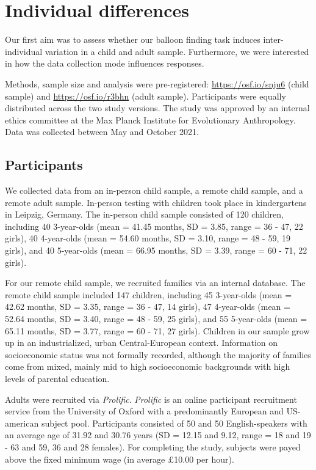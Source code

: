 \documentclass[
  man,floatsintext]{apa6}
\begin{document}
\hypertarget{individual-differences}{%
\section{Individual differences}\label{individual-differences}}

Our first aim was to assess whether our balloon finding task induces inter-individual variation in a child and adult sample. Furthermore, we were interested in how the data collection mode influences responses.

Methods, sample size and analysis were pre-registered: \url{https://osf.io/snju6} (child sample) and \url{https://osf.io/r3bhn} (adult sample). Participants were equally distributed across the two study versions. The study was approved by an internal ethics committee at the Max Planck Institute for Evolutionary Anthropology. Data was collected between May and October 2021.

\hypertarget{participants}{%
\subsection{Participants}\label{participants}}

We collected data from an in-person child sample, a remote child sample, and a remote adult sample.
In-person testing with children took place in kindergartens in Leipzig, Germany. The in-person child sample consisted of
120 children, including
40 3-year-olds
(mean = 41.45 months,
SD = 3.85,
range = 36
- 47,
22 girls),
40 4-year-olds
(mean = 54.60 months,
SD = 3.10,
range = 48
- 59,
19 girls),
and 40 5-year-olds
(mean = 66.95 months,
SD = 3.39,
range = 60
- 71,
22 girls).

For our remote child sample, we recruited families via an internal database. The remote child sample included 147 children, including
45 3-year-olds
(mean = 42.62 months,
SD = 3.35,
range = 36
- 47,
14 girls),
47 4-year-olds
(mean = 52.64 months,
SD = 3.40,
range = 48
- 59,
25 girls),
and 55 5-year-olds
(mean = 65.11 months,
SD = 3.77,
range = 60
- 71,
27 girls). Children in our sample grow up in an industrialized, urban Central-European context. Information on socioeconomic status was not formally recorded, although the majority of families come from mixed, mainly mid to high socioeconomic backgrounds with high levels of parental education.

Adults were recruited via \emph{Prolific}. \emph{Prolific} is an online participant recruitment service from the University of Oxford with a predominantly European and US-american subject pool. Participants consisted of 50 and 50 English-speakers with an average age of 31.92 and 30.76 years (SD = 12.15 and 9.12, range = 18 and 19 - 63 and 59, 36 and 28 females).
For completing the study, subjects were payed above the fixed minimum wage (in average £10.00 per hour).
\end{document}
